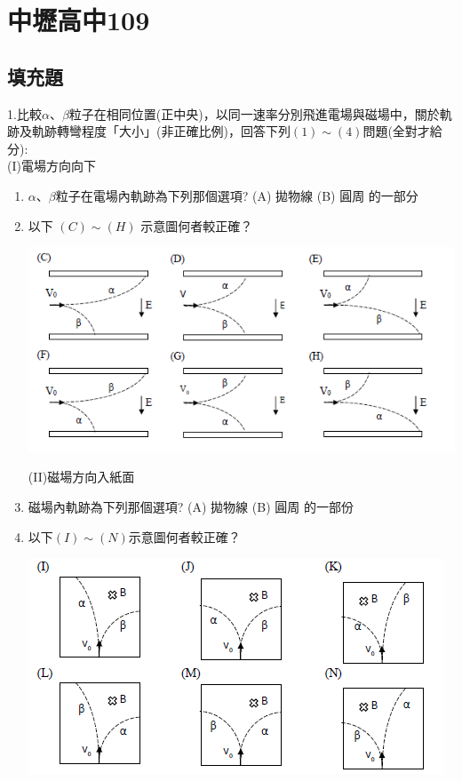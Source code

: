 \documentclass[cn,10pt,math=newtx]{elegantbook}
\begin{document}
\newpage


\chapter{中壢高中109}
\section{填充題}


\begin{example}
   1.比較$\alpha、\beta$粒子在相同位置(正中央)，以同一速率分別飛進電場與磁場中，關於軌跡及軌跡轉彎程度「大小」(非正確比例)，回答下列$(1)\sim(4)$問題(全對才給分):\\
(I)電場方向向下
   \begin{enumerate}[label=(\arabic*)] 
  \item $\alpha、\beta$粒子在電場內軌跡為下列那個選項? (A) 拋物線 (B) 圓周  的一部分
  \item 以下 $(C)\sim(H)$ 示意圖何者較正確？
    \begin{center}
\includegraphics[scale=1.2]{image/109中壢1-1.png}
\end{center}
(II)磁場方向入紙面
  \item 磁場內軌跡為下列那個選項? (A) 拋物線 (B) 圓周 的一部份
  \item 以下$(I)\sim (N)$示意圖何者較正確？
  \begin{center}
\includegraphics[scale=1.2]{image/109中壢1-2.png}
\end{center}

    \end{enumerate}

    \rightline{[中壢高中教甄109]}
\end{example}
\begin{solution}
    
\end{solution}
\end{document}

